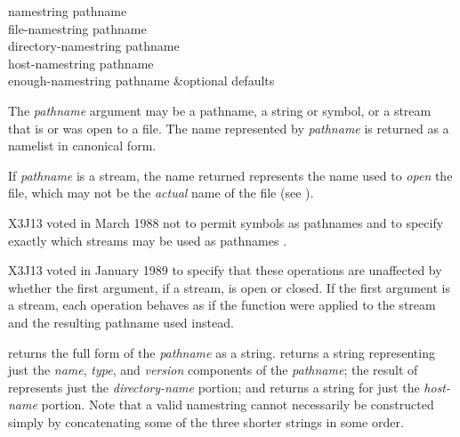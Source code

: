 \begin{defun}[Function]
namestring pathname \\
file-namestring pathname \\
directory-namestring pathname \\
host-namestring pathname \\
enough-namestring pathname &optional defaults

The \emph{pathname} argument may be a pathname, a string or symbol,
or a stream that is or was open to a file.
The name represented by \emph{pathname} is returned as a namelist
in canonical form.

If \emph{pathname} is a stream, the name returned represents the
name used to \emph{open} the file, which may not be the \emph{actual}
name of the file (see ).

\begin{new}
X3J13 voted in March 1988
not to permit symbols as pathnames
 and
to specify exactly which streams may be used as pathnames
.
\end{new}

\begin{new}
X3J13 voted in January 1989
to specify that these operations are unaffected by
whether the first argument, if a stream, is open or closed. If the first
argument is a stream, each operation behaves as if the function 
were applied to the stream and the resulting pathname used instead.
\end{new}

 returns the full form of the \emph{pathname} as a string.
 returns a string representing just the \emph{name},
\emph{type}, and \emph{version} components of the \emph{pathname};
the result of 
represents just the \emph{directory-name} portion; and 
returns a string for just the \emph{host-name} portion.
Note that a valid namestring cannot necessarily be constructed
simply by concatenating some of the three shorter strings in some order.


\end{defun}
